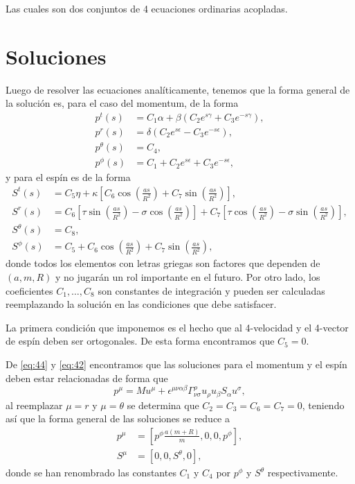 Las cuales son dos conjuntos de 4 ecuaciones ordinarias acopladas.

\section{Soluciones}

Luego de resolver las ecuaciones analíticamente, tenemos que la forma general de la solución es, para el caso del momentum, de la forma
\begin{align}
p^t(s) &= C_1 \alpha + \beta \left( C_2 e^{s \gamma} + C_3 e^{-s \gamma} \right),\\
p^r(s) &= \delta \left( C_2 e^{s \epsilon} - C_3 e^{-s \epsilon} \right),\\
p^{\theta}(s) &= C_4,\\
p^{\phi}(s) &= C_1 + C_2 e^{s \epsilon} + C_3 e^{-s \epsilon},
\end{align}
y para el espín es de la forma
\begin{align}
S^t(s) &= C_5 \eta + \kappa \left[ C_6 \cos\left(\frac{as}{R^2} \right) + C_7 \sin\left(\frac{as}{R^2} \right) \right],\\
S^r(s) &= C_6 \left[ \tau \sin\left(\frac{as}{R^2} \right) - \sigma \cos\left(\frac{as}{R^2} \right) \right] 
+ C_7 \left[ \tau \cos\left(\frac{as}{R^2} \right) - \sigma \sin\left(\frac{as}{R^2} \right) \right],\\
S^{\theta}(s) &= C_8,\\
S^{\phi}(s) &= C_5 + C_6 \cos\left(\frac{as}{R^2} \right) + C_7 \sin\left(\frac{as}{R^2} \right),
\end{align}
donde todos los elementos con letras griegas son factores que dependen de $(a,m,R)$ y no jugarán un rol importante en el futuro. Por otro lado, los coeficientes $C_1, \dots, C_8$ son constantes de integración y pueden ser calculadas reemplazando la solución en las condiciones que debe satisfacer.

La primera condición que imponemos es el hecho que al 4-velocidad y el 4-vector de espín deben ser ortogonales. De esta forma encontramos que $C_5=0$.

De \eqref{eq:44} y \eqref{eq:42} encontramos que las soluciones para el momentum y el espín deben estar relacionadas de forma que
\begin{equation}
p^{\mu} = M u^{\mu} + \epsilon^{\mu \nu \alpha \beta} \Gamma^{\rho}_{\nu \sigma} u_{\rho} u_{\beta} S_{\alpha} u^{\sigma},
\end{equation}
al reemplazar $\mu=r$ y $\mu=\theta$ se determina que $C_2 = C_3 = C_6 = C_7 = 0$, teniendo así que la forma general de las soluciones se reduce a 
\begin{align}
\label{eq:73}
p^{\mu} &= \left[ p^{\phi} \frac{a(m+R)}{m}, 0, 0, p^{\phi} \right],\\
\label{eq:74}
S^{\mu} &= \left[ 0,0,S^{\theta},0 \right],
\end{align}
donde se han renombrado las constantes $C_1$ y $C_4$ por $p^{\phi}$ y $S^{\theta}$ respectivamente.

